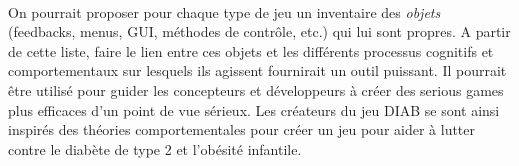 \paragraph{} On pourrait proposer pour chaque type de jeu un inventaire des \emph{objets} (feedbacks, menus, GUI, méthodes de contrôle, etc.) qui lui sont propres. A partir de cette liste, faire le lien entre ces objets et les différents processus cognitifs et comportementaux sur lesquels ils agissent fournirait un outil puissant. Il pourrait être utilisé pour guider les concepteurs et développeurs à créer des serious games plus efficaces d'un point de vue sérieux. Les créateurs du jeu DIAB\cite{Wils09} se sont ainsi inspirés des théories comportementales pour créer un jeu pour aider à lutter contre le diabète de type 2 et l'obésité infantile.